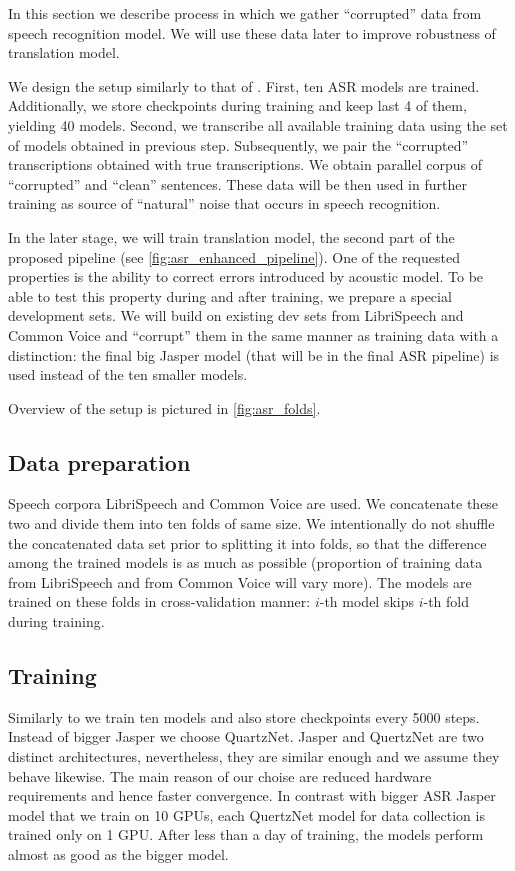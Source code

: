 In this section we describe process in which we gather ``corrupted'' data from speech recognition model. We will use these data later to improve robustness of translation model.

We design the setup similarly to that of . First, ten ASR models are trained. Additionally, we store checkpoints during training and keep last 4 of them, yielding 40 models. Second, we transcribe all available training data using the set of models obtained in previous step. Subsequently, we pair the ``corrupted'' transcriptions obtained with true transcriptions. We obtain parallel corpus of ``corrupted'' and ``clean'' sentences. These data will be then used in further training as source of ``natural'' noise that occurs in speech recognition.

In the later stage, we will train translation model, the second part of the proposed pipeline (see \cref{fig:asr_enhanced_pipeline}). One of the requested properties is the ability to correct errors introduced by acoustic model. To be able to test this property during and after training, we prepare a special development sets. We will build on existing dev sets from LibriSpeech and Common Voice and ``corrupt'' them in the same manner as training data with a distinction: the final big Jasper model (that will be in the final ASR pipeline) is used instead of the ten smaller models. 

Overview of the setup is pictured in \cref{fig:asr_folds}.

\subsection{Data preparation}
Speech corpora LibriSpeech and Common Voice are used. We concatenate these two and divide them into ten folds of same size. We intentionally do not shuffle the concatenated data set prior to splitting it into folds, so that the difference among the trained models is as much as possible (proportion of training data from LibriSpeech and from Common Voice will vary more). The models are trained on these folds in cross-validation manner: $i$-th model skips $i$-th fold during training.

\subsection{Training}
Similarly to  we train ten models and also store checkpoints every 5000 steps. Instead of bigger Jasper we choose QuartzNet. Jasper and QuertzNet are two distinct architectures, nevertheless, they are similar enough and we assume they behave likewise. The main reason of our choise are reduced hardware requirements and hence faster convergence. In contrast with bigger ASR Jasper model that we train on 10 GPUs, each QuertzNet model for data collection is trained only on 1 GPU. After less than a day of training, the models perform almost as good as the bigger model.

